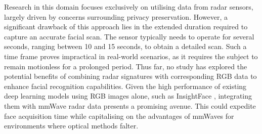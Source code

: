 \documentclass{mpaper}
\begin{document}
Research in this domain focuses exclusively on utilising data from radar sensors, largely driven by concerns surrounding privacy preservation. However, a significant drawback of this approach lies in the extended duration required to capture an accurate facial scan. The sensor typically needs to operate for several seconds, ranging between 10 and 15 seconds, to obtain a detailed scan. Such a time frame proves impractical in real-world scenarios, as it requires the subject to remain motionless for a prolonged period. Thus far, no study has explored the potential benefits of combining radar signatures with corresponding RGB data to enhance facial recognition capabilities. Given the high performance of existing deep learning models using RGB images alone, such as InsightFace \cite{deng2018arcface}, integrating them with mmWave radar data presents a promising avenue. This could expedite face acquisition time while capitalising on the advantages of mmWaves for environments where optical methods falter.


\vspace{-11pt}
\end{document}
